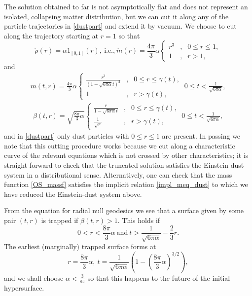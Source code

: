 \documentclass[11pt]{article}
\begin{document}
The solution obtained to far is not asymptotically flat and does not
represent an isolated, collapsing matter distribution, but
we can cut it along any of the particle trajectories in \eqref{dustpart}
and extend it by vacuum. We choose to cut along the trajectory
starting at $r=1$ so that
\[
\mathring{\rho}(r) = \alpha 1_{[0,1]}(r),\ \mbox{i.e.,}\
\mathring{m}(r) = \frac{4\pi}{3} \alpha
\left\{ \begin{array}{ccl} r^3 &,& 0\leq r \leq 1,\\
  1&,& r>1,
  \end{array}\right.
\]
and
\begin{align}\label{OS_massf}
m(t,r) = \frac{4\pi}{3} \alpha
\left\{ \begin{array}{ccl}
  \displaystyle
  \frac{r^3}{(1-\sqrt{6\pi \alpha} t)^2} &,& 0\leq r\leq \gamma(t),\\
  1 &,& r> \gamma(t),
  \end{array}\right.
\ 0\leq t < \frac{1}{\sqrt{6\pi \alpha}},
\end{align}
\begin{align}\label{OSdustbeta}
\beta(t,r) = \sqrt{\frac{8\pi}{3} \alpha}
\left\{ \begin{array}{ccl}
  \displaystyle
  \frac{r}{1-\sqrt{6\pi \alpha} t}&,& 0\leq r\leq \gamma(t),\\
  \displaystyle\frac{1}{\sqrt{r}}&,& r> \gamma(t),
\end{array}\right.
\ 0\leq t < \frac{1}{\sqrt{6\pi \alpha}},
\end{align}
and in \eqref{dustpart} only dust particles with
$0\leq r \leq 1$ are present. In passing we note that
this cutting procedure works because we cut along a characteristic
curve of the relevant equations which is not crossed by other
characteristics; it is straight forward to check that the
truncated solution satisfies the Einstein-dust system in a
distributional sense. Alternatively, one can check that the
mass function \eqref{OS_massf} satisfies the implicit
relation \eqref{impl_meq_dust} to which we have reduced
the Einstein-dust system above.

From the equation for radial null geodesics we see that a surface
given by some pair $(t,r)$ is trapped if $\beta(t,r)>1$. This holds
if
\[
0<r<\frac{8\pi}{3} \alpha\ \mbox{and}\
t > \frac{1}{\sqrt{6\pi\alpha}} - \frac{2}{3} r. 
\]
The earliest (marginally) trapped surface forms at
\[
r = \frac{8\pi}{3}\alpha,\ 
t = \frac{1}{\sqrt{6\pi\alpha}}
\left(1-\left(\frac{8\pi}{3}\alpha\right)^{3/2}\right),
\]
and we shall choose $\alpha<\frac{3}{8\pi}$ so that this happens to the future
of the initial hypersurface.
%
%
\end{document}
